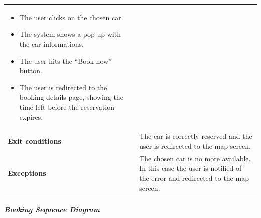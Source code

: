 \documentclass[]{article}
\let\oldsubparagraph\subparagraph
\renewcommand{\subparagraph}[1]{\oldsubparagraph{#1}\mbox{}}
\begin{document}
\begin{longtable}[]{@{}ll@{}}
\begin{minipage}[t]{0.65\columnwidth}
\begin{itemize}
  location
\item
  The user clicks on the chosen car.
\item
  The system shows a pop-up with the car informations.
\item
  The user hits the ``Book now'' button.
\item
  The user is redirected to the booking details page, showing the time
  left before the reservation expires.
\end{itemize}\strut
\end{minipage}\tabularnewline
\begin{minipage}[t]{0.29\columnwidth}\raggedright\strut
\textbf{Exit conditions}\strut
\end{minipage} & \begin{minipage}[t]{0.65\columnwidth}\raggedright\strut
The car is correctly reserved and the user is redirected to the map
screen.\strut
\end{minipage}\tabularnewline
\begin{minipage}[t]{0.29\columnwidth}\raggedright\strut
\textbf{Exceptions}\strut
\end{minipage} & \begin{minipage}[t]{0.65\columnwidth}\raggedright\strut
The chosen car is no more available. In this case the user is notified
of the error and redirected to the map screen.\strut
\end{minipage}\tabularnewline
\bottomrule
\end{longtable}

\newpage

\subparagraph{Booking Sequence Diagram}\label{booking-sequence-diagram}
\end{document}
